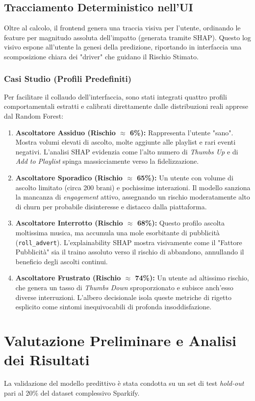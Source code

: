 \documentclass[11pt,a4paper]{article}
\begin{document}
\subsection{Tracciamento Deterministico nell'UI}
Oltre al calcolo, il frontend genera una traccia visiva per l'utente, ordinando le feature per magnitudo assoluta dell'impatto (generata tramite SHAP). Questo log visivo espone all'utente la genesi della predizione, riportando in interfaccia una scomposizione chiara dei "driver" che guidano il Rischio Stimato.

\subsubsection{Casi Studio (Profili Predefiniti)}
Per facilitare il collaudo dell'interfaccia, sono stati integrati quattro profili comportamentali estratti e calibrati direttamente dalle distribuzioni reali apprese dal Random Forest:
\begin{enumerate}
    \item \textbf{Ascoltatore Assiduo (Rischio $\approx$ 6\%):} Rappresenta l'utente "sano". Mostra volumi elevati di ascolto, molte aggiunte alle playlist e rari eventi negativi. L'analisi SHAP evidenzia come l'alto numero di \textit{Thumbs Up} e di \textit{Add to Playlist} spinga massicciamente verso la fidelizzazione.
    \item \textbf{Ascoltatore Sporadico (Rischio $\approx$ 65\%):} Un utente con volume di ascolto limitato (circa 200 brani) e pochissime interazioni. Il modello sanziona la mancanza di \textit{engagement} attivo, assegnando un rischio moderatamente alto di churn per probabile disinteresse e distacco dalla piattaforma.
    \item \textbf{Ascoltatore Interrotto (Rischio $\approx$ 68\%):} Questo profilo ascolta moltissima musica, ma accumula una mole esorbitante di pubblicità (\texttt{roll\_advert}). L'explainability SHAP mostra visivamente come il "Fattore Pubblicità" sia il traino assoluto verso il rischio di abbandono, annullando il beneficio degli ascolti continui.
    \item \textbf{Ascoltatore Frustrato (Rischio $\approx$ 74\%):} Un utente ad altissimo rischio, che genera un tasso di \textit{Thumbs Down} sproporzionato e subisce anch'esso diverse interruzioni. L'albero decisionale isola queste metriche di rigetto esplicito come sintomi inequivocabili di profonda insoddisfazione.
\end{enumerate}

\section{Valutazione Preliminare e Analisi dei Risultati}
La validazione del modello predittivo è stata condotta su un set di test \textit{hold-out} pari al 20\% del dataset complessivo Sparkify. 
\end{document}
